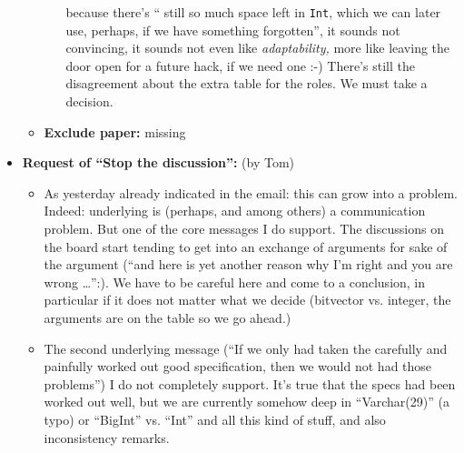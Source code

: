 \begin{itemize}
\begin{itemize}
\begin{itemize}
    because there's `` still so much space left in \texttt{Int}, which we can
    later use, perhaps, if we have something forgotten'', it sounds not
    convincing, it sounds not even like \emph{adaptability,} more like leaving
    the door open for a future hack, if we need one :-) There's still the
    disagreement about the extra table for the roles. We must take a decision.
  \end{itemize}
\item\textbf{Exclude paper:} missing
  \end{itemize}
\item \textbf{Request of ``Stop the discussion'':} (by Tom) 
  \begin{itemize}
  \item As yesterday already indicated in the email: this can grow into a
    problem. Indeed: underlying is (perhaps, and among others) a communication
    problem. But one of the core messages I do support. The discussions on the
    board start tending to get into an exchange of arguments for sake of the
    argument (``and here is yet another reason why I'm right and you are wrong
    \ldots'':). We have to be careful here and come to a conclusion, in
    particular if it does not matter what we decide (bitvector vs. integer,
    the arguments are on the table so we go ahead.)
  \item The second underlying message (``If we only had taken the carefully
    and painfully worked out good specification, then we would not had those
    problems'') I do not completely support. It's true that the specs had been
    worked out well, but we are currently somehow deep in ``Varchar(29)'' (a
    typo) or ``BigInt'' vs. ``Int'' and all this kind of stuff, and also
    inconsistency remarks. 
    

\end{itemize}
\end{itemize}
